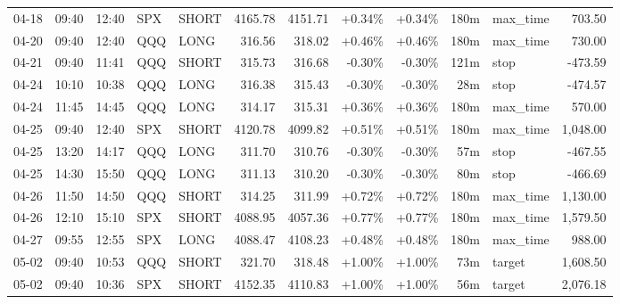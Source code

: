 \documentclass[11pt,a4paper,twoside]{article}
\begin{document}
\begin{center}
\begin{longtable}{>{\color{txtmain}}l l l l l r r r r r >{\color{txtmain}}l r}
04-18 & 09:40 & 12:40 & SPX & SHORT & 4165.78 & 4151.71 & \textcolor{wingreen}{+0.34\%} & \textcolor{wingreen}{+0.34\%} & 180m & max\_time & \textcolor{wingreen}{703.50} \\
04-20 & 09:40 & 12:40 & QQQ & LONG & 316.56 & 318.02 & \textcolor{wingreen}{+0.46\%} & \textcolor{wingreen}{+0.46\%} & 180m & max\_time & \textcolor{wingreen}{730.00} \\
04-21 & 09:40 & 11:41 & QQQ & SHORT & 315.73 & 316.68 & \textcolor{lossred}{-0.30\%} & \textcolor{lossred}{-0.30\%} & 121m & stop & \textcolor{lossred}{-473.59} \\
04-24 & 10:10 & 10:38 & QQQ & LONG & 316.38 & 315.43 & \textcolor{lossred}{-0.30\%} & \textcolor{lossred}{-0.30\%} & 28m & stop & \textcolor{lossred}{-474.57} \\
04-24 & 11:45 & 14:45 & QQQ & LONG & 314.17 & 315.31 & \textcolor{wingreen}{+0.36\%} & \textcolor{wingreen}{+0.36\%} & 180m & max\_time & \textcolor{wingreen}{570.00} \\
04-25 & 09:40 & 12:40 & SPX & SHORT & 4120.78 & 4099.82 & \textcolor{wingreen}{+0.51\%} & \textcolor{wingreen}{+0.51\%} & 180m & max\_time & \textcolor{wingreen}{1,048.00} \\
04-25 & 13:20 & 14:17 & QQQ & LONG & 311.70 & 310.76 & \textcolor{lossred}{-0.30\%} & \textcolor{lossred}{-0.30\%} & 57m & stop & \textcolor{lossred}{-467.55} \\
04-25 & 14:30 & 15:50 & QQQ & LONG & 311.13 & 310.20 & \textcolor{lossred}{-0.30\%} & \textcolor{lossred}{-0.30\%} & 80m & stop & \textcolor{lossred}{-466.69} \\
04-26 & 11:50 & 14:50 & QQQ & SHORT & 314.25 & 311.99 & \textcolor{wingreen}{+0.72\%} & \textcolor{wingreen}{+0.72\%} & 180m & max\_time & \textcolor{wingreen}{1,130.00} \\
04-26 & 12:10 & 15:10 & SPX & SHORT & 4088.95 & 4057.36 & \textcolor{wingreen}{+0.77\%} & \textcolor{wingreen}{+0.77\%} & 180m & max\_time & \textcolor{wingreen}{1,579.50} \\
04-27 & 09:55 & 12:55 & SPX & LONG & 4088.47 & 4108.23 & \textcolor{wingreen}{+0.48\%} & \textcolor{wingreen}{+0.48\%} & 180m & max\_time & \textcolor{wingreen}{988.00} \\
05-02 & 09:40 & 10:53 & QQQ & SHORT & 321.70 & 318.48 & \textcolor{wingreen}{+1.00\%} & \textcolor{wingreen}{+1.00\%} & 73m & target & \textcolor{wingreen}{1,608.50} \\
05-02 & 09:40 & 10:36 & SPX & SHORT & 4152.35 & 4110.83 & \textcolor{wingreen}{+1.00\%} & \textcolor{wingreen}{+1.00\%} & 56m & target & \textcolor{wingreen}{2,076.18} \\

\end{longtable}
\end{center}
\end{document}
